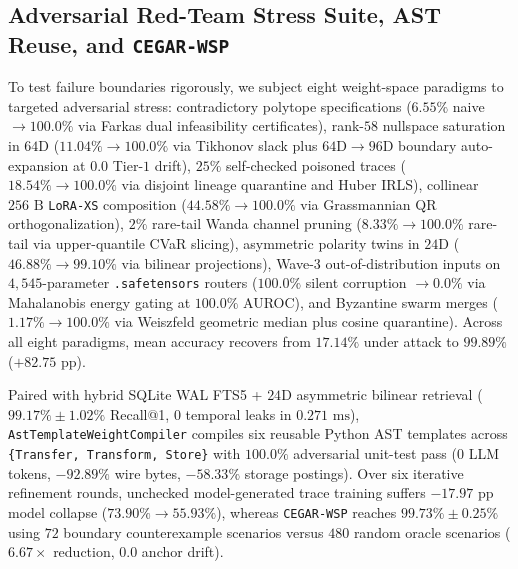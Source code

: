 \documentclass[11pt,a4paper]{article}
\begin{document}
\subsection{Adversarial Red-Team Stress Suite, AST Reuse, and \texttt{CEGAR-WSP}}
To test failure boundaries rigorously, we subject eight weight-space paradigms to targeted adversarial stress: contradictory polytope specifications ($6.55\%$ naive $\to 100.0\%$ via Farkas dual infeasibility certificates), rank-$58$ nullspace saturation in $64\text{D}$ ($11.04\% \to 100.0\%$ via Tikhonov slack plus $64\text{D} \to 96\text{D}$ boundary auto-expansion at $0.0$ Tier-$1$ drift), $25\%$ self-checked poisoned traces ($18.54\% \to 100.0\%$ via disjoint lineage quarantine and Huber IRLS), collinear $256\text{ B}$ \texttt{LoRA-XS} composition ($44.58\% \to 100.0\%$ via Grassmannian QR orthogonalization), $2\%$ rare-tail Wanda channel pruning ($8.33\% \to 100.0\%$ rare-tail via upper-quantile CVaR slicing), asymmetric polarity twins in $24\text{D}$ ($46.88\% \to 99.10\%$ via bilinear projections), Wave-$3$ out-of-distribution inputs on $4{,}545$-parameter \texttt{.safetensors} routers ($100.0\%$ silent corruption $\to 0.0\%$ via Mahalanobis energy gating at $100.0\%$ AUROC), and Byzantine swarm merges ($1.17\% \to 100.0\%$ via Weiszfeld geometric median plus cosine quarantine). Across all eight paradigms, mean accuracy recovers from $17.14\%$ under attack to $99.89\%$ ($+82.75\text{ pp}$).

Paired with hybrid SQLite WAL FTS5 + $24\text{D}$ asymmetric bilinear retrieval ($99.17\% \pm 1.02\%$ Recall@1, $0$ temporal leaks in $0.271\text{ ms}$), \texttt{AstTemplateWeightCompiler} compiles six reusable Python AST templates across \texttt{\{Transfer, Transform, Store\}} with $100.0\%$ adversarial unit-test pass ($0$ LLM tokens, $-92.89\%$ wire bytes, $-58.33\%$ storage postings). Over six iterative refinement rounds, unchecked model-generated trace training suffers $-17.97\text{ pp}$ model collapse ($73.90\% \to 55.93\%$), whereas \texttt{CEGAR-WSP} reaches $99.73\% \pm 0.25\%$ using $72$ boundary counterexample scenarios versus $480$ random oracle scenarios ($6.67\times$ reduction, $0.0$ anchor drift).
\end{document}
